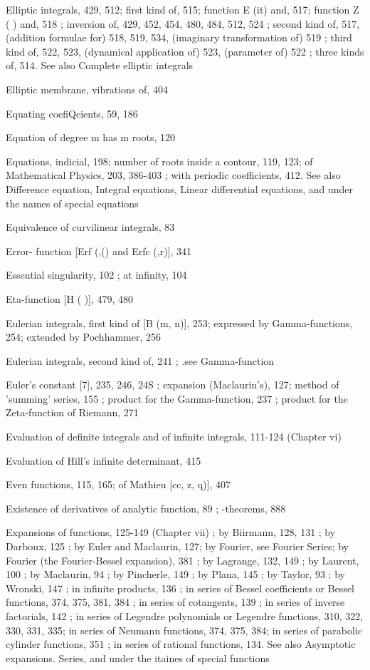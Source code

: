 %
%

Elliptic integrals, 429, 512; first kind of, 515; function E (it) and, 517; function Z ( ) and,
518 ; inversion of, 429, 452, 454, 480, 484, 512, 524 ; second kind of, 517, (addition formulae
for) 518, 519, 534, (imaginary transformation of) 519 ; third kind of, 522, 523, (dynamical
application of) 523, (parameter of) 522 ; three kinds of, 514. See also Complete elliptic
integrals

Elliptic membrane, vibrations of, 404

Equating coefiQcients, 59, 186

Equation of degree m has m roots, 120

Equations, indicial, 198; number of roots inside a contour, 119, 123; of Mathematical Physics,
203, 386-403 ; with periodic coefficients, 412. See also Difference equation, Integral
equations, Linear differential equations, and under the names of special equations

Equivalence of curvilinear integrals, 83

Error- function [Erf (,() and Erfc (,r)], 341

Essential singularity, 102 ; at infinity, 104

Eta-function [H ( )], 479, 480

Eulerian integrals, first kind of [B (m, n)], 253; expressed by Gamma-functions, 254; extended
by Pochhammer, 256

Eulerian integrals, second kind of, 241 ; .see Gamma-function

Euler's constant [7], 235, 246, 24S ; expansion (Maclaurin's), 127; method of 'summing' series,
155 ; product for the Gamma-function, 237 ; product for the Zeta-function of Riemann, 271

Evaluation of definite integrals and of infinite integrals, 111-124 (Chapter vi)

Evaluation of Hill's infinite determinant, 415

Even functions, 115, 165; of Mathieu [cc,  z, q)], 407

Existence of derivatives of analytic function, 89 ; -theorems, 888

Expansions of functions, 125-149 (Chapter vii) ; by Biirmann, 128, 131 ; by Darboux, 125 ; by
Euler and Maclaurin, 127; by Fourier, see Fourier Series; by Fourier (the Fourier-Bessel
expansion), 381 ; by Lagrange, 132, 149 ; by Laurent, 100 ; by Maclaurin, 94 ; by Pincherle,
149 ; by Plana, 145 ; by Taylor, 93 ; by Wronski, 147 ; in infinite products, 136 ; in series of
Bessel coefficients or Bessel functions, 374, 375, 381, 384 ; in series of cotangents, 139 ; in
series of inverse factorials, 142 ; in series of Legendre polynomials or Legendre functions,
310, 322, 330, 331, 335; in series of Neumann functions, 374, 375, 384; in series of parabolic
cylinder functions, 351 ; in series of rational functions, 134. See also Asymptotic expansions.
Series, and under the itaines of special functions

